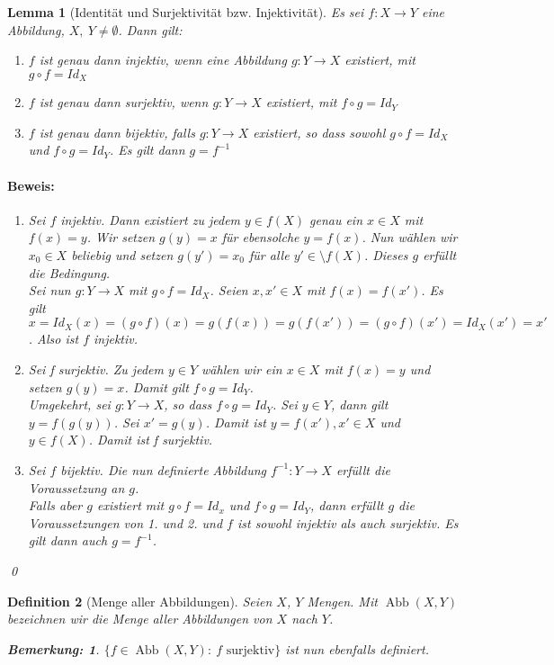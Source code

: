 \documentclass{report}
\newcommand{\IN}[1]{\index{#1|BH}}
\DeclareMathOperator{\abb}{Abb}
\theoremstyle{customrem}
\newtheorem*{bemerkung}{Bemerkung\textnormal:}
\theoremstyle{customdef}
\newtheorem{definition}{Definition}[chapter]
\newtheorem{lemma}[definition]{Lemma}
\renewenvironment{proof}{\paragraph{Beweis: }}{\qed}
\begin{document}
	\begin{lemma}[Identität und Surjektivität bzw. Injektivität]
		Es sei $f : X \to Y$ eine Abbildung, $X,\ Y \neq \emptyset$. Dann gilt:
		\begin{enumerate}
			\itemsep0cm
			\item $f$ ist genau dann injektiv, wenn eine Abbildung $g : Y \to X$ existiert, mit $g \circ f = Id_X$
			\item $f$ ist genau dann surjektiv, wenn $g : Y \to X$ existiert, mit $f \circ g = Id_Y$
			\item $f$ ist genau dann bijektiv, falls $g : Y \to X$ existiert, so dass sowohl $g \circ f = Id_X$ und $f \circ g = Id_Y$. Es gilt dann $g = f^{-1}$
		\end{enumerate}
		\begin{proof}
			\begin{enumerate}
				\item Sei $f$ injektiv. Dann existiert zu jedem $y \in f(X)$ genau ein $x \in X$ mit $f(x) = y$. Wir setzen $g(y) = x$ für ebensolche $y = f(x)$. Nun wählen wir $x_0\in X$ beliebig und setzen $g(y') = x_0$ für alle $y' \in \setminus f(X)$. Dieses $g$ erfüllt die Bedingung.\\
				Sei nun $g : Y \to X$ mit $g \circ f = Id_X$. Seien $x, x' \in X$ mit $f(x) = f(x')$. Es gilt $x = Id_X(x) = (g \circ f)(x) = g(f(x)) = g(f(x')) = (g \circ f)(x') = Id_X(x') = x'$. Also ist $f$ injektiv.
				\item Sei f surjektiv. Zu jedem $y \in Y$ wählen wir ein $x \in X$ mit $f(x) = y$ und setzen $g(y) = x$. Damit gilt $f \circ g = Id_Y$.\\
				Umgekehrt, sei $g : Y \to X$, so dass $f \circ g = Id_Y$. Sei $y \in Y$, dann gilt $y = f(g(y))$. Sei $x' = g(y)$. Damit ist $y = f(x'), x' \in X$ und $y \in f(X)$. Damit ist f surjektiv.
				\item Sei $f$ bijektiv. Die nun definierte Abbildung $f^{-1} : Y \to X$ erfüllt die Voraussetzung an $g$.\\
				Falls aber $g$ existiert mit $g \circ f = Id_x$ und $f \circ g = Id_Y$, dann erfüllt $g$ die Voraussetzungen von 1. und 2. und $f$ ist sowohl injektiv als auch surjektiv. Es gilt dann auch $g = f^{-1}$.
			\end{enumerate}
		\end{proof}
	\end{lemma}
	
	\begin{definition}[Menge aller Abbildungen]
		\IN{Menge aller Abbildungen}
		Seien $X$, $Y$ Mengen. Mit $\abb(X, Y)$ bezeichnen wir die Menge aller Abbildungen von $X$ nach $Y$.
		\begin{bemerkung}
			$\{ f \in \abb(X, Y) :\ f \text{ surjektiv}\}$ ist nun ebenfalls definiert.
		\end{bemerkung}
	\end{definition}
	
\end{document}
